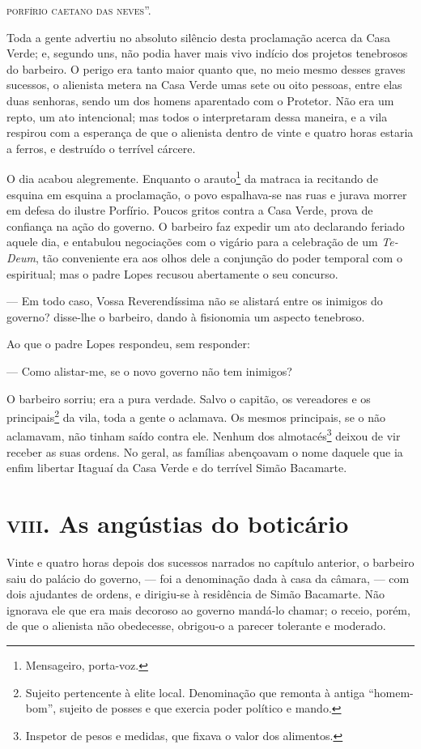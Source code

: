 \textsc{porfírio caetano das neves}''.

Toda a gente advertiu no absoluto silêncio desta proclamação acerca da
Casa Verde; e, segundo uns, não podia haver mais vivo indício dos
projetos tenebrosos do barbeiro. O perigo era tanto maior quanto que, no
meio mesmo desses graves sucessos, o alienista metera na Casa Verde umas
sete ou oito pessoas, entre elas duas senhoras, sendo um dos homens
aparentado com o Protetor. Não era um repto, um ato intencional; mas
todos o interpretaram dessa maneira, e a vila respirou com a esperança
de que o alienista dentro de vinte e quatro horas estaria a ferros, e
destruído o terrível cárcere.

O dia acabou alegremente. Enquanto o arauto\footnote{Mensageiro,
  porta-voz.} da matraca ia recitando de esquina em esquina a
proclamação, o povo espalhava-se nas ruas e jurava morrer em defesa do
ilustre Porfírio. Poucos gritos contra a Casa Verde, prova de confiança
na ação do governo. O barbeiro faz expedir um ato declarando feriado
aquele dia, e entabulou negociações com o vigário para a celebração de
um \emph{Te-Deum}, tão conveniente era aos olhos dele a conjunção do
poder temporal com o espiritual; mas o padre Lopes recusou abertamente o
seu concurso.

--- Em todo caso, Vossa Reverendíssima não se alistará entre os inimigos
do governo? disse-lhe o barbeiro, dando à fisionomia um aspecto
tenebroso.

Ao que o padre Lopes respondeu, sem responder:

--- Como alistar-me, se o novo governo não tem inimigos?

O barbeiro sorriu; era a pura verdade. Salvo o capitão, os vereadores e
os principais\footnote{Sujeito pertencente à elite local. Denominação
  que remonta à antiga ``homem-bom'', sujeito de posses e que exercia
  poder político e mando.} da vila, toda a gente o aclamava. Os mesmos
principais, se o não aclamavam, não tinham saído contra ele. Nenhum dos
almotacés\footnote{Inspetor de pesos e medidas, que fixava o valor dos
  alimentos.} deixou de vir receber as suas ordens. No geral, as
famílias abençoavam o nome daquele que ia enfim libertar Itaguaí da Casa
Verde e do terrível Simão Bacamarte.

\section*{\textsc{viii}. As angústias do boticário}

Vinte e quatro horas depois dos sucessos narrados no capítulo anterior,
o barbeiro saiu do palácio do governo, --- foi a denominação dada à casa
da câmara, --- com dois ajudantes de ordens, e dirigiu-se à residência
de Simão Bacamarte. Não ignorava ele que era mais decoroso ao governo
mandá-lo chamar; o receio, porém, de que o alienista não obedecesse,
obrigou-o a parecer tolerante e moderado.

